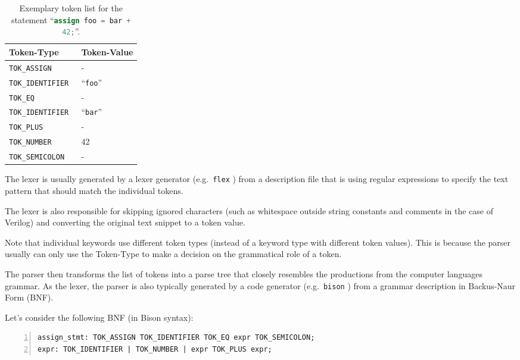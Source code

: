 \begin{table}[t]
\hfil
\begin{tabular}{ll}
Token-Type & Token-Value \\
\hline
\tt TOK\_ASSIGN & - \\
\tt TOK\_IDENTIFIER & ``{\tt foo}'' \\
\tt TOK\_EQ & - \\
\tt TOK\_IDENTIFIER & ``{\tt bar}'' \\
\tt TOK\_PLUS & - \\
\tt TOK\_NUMBER & 42 \\
\tt TOK\_SEMICOLON & - \\
\end{tabular}
\caption{Exemplary token list for the statement ``\lstinline[language=Verilog]{assign foo = bar + 42;}''.}
\label{tab:Basics_tokens}
\end{table}

The lexer is usually generated by a lexer generator (e.g.~{\tt flex} ) from a
description file that is using regular expressions to specify the text pattern that should match
the individual tokens.

The lexer is also responsible for skipping ignored characters (such as whitespace outside string
constants and comments in the case of Verilog) and converting the original text snippet to a token
value.

Note that individual keywords use different token types (instead of a keyword type with different
token values). This is because the parser usually can only use the Token-Type to make a decision on
the grammatical role of a token.

The parser then transforms the list of tokens into a parse tree that closely resembles the productions
from the computer languages grammar. As the lexer, the parser is also typically generated by a code
generator (e.g.~{\tt bison} ) from a grammar description in Backus-Naur Form (BNF).

Let's consider the following BNF (in Bison syntax):

\begin{lstlisting}[numbers=left,frame=single]
assign_stmt: TOK_ASSIGN TOK_IDENTIFIER TOK_EQ expr TOK_SEMICOLON;
expr: TOK_IDENTIFIER | TOK_NUMBER | expr TOK_PLUS expr;
\end{lstlisting}

